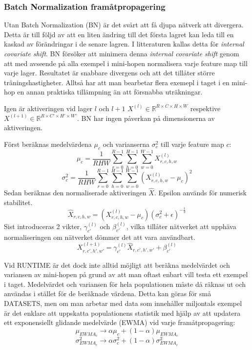\documentclass[a4paper,11pt,twoside]{article}
\begin{document}
\subsubsection{Batch Normalization framåtpropagering}
Utan Batch Normalization (BN) är det svårt att få djupa nätverk att divergera. Detta är till följd av att en liten ändring till det första lagret kan leda till en kaskad av förändringar i de senare lagren. I litteraturen kallas detta för \textit{internal covariate shift}. BN försöker att minimera denna \textit{internal covariate shift} genom att med avseende på alla exempel i mini-hopen normalisera varje feature map till varje lager. Resultatet är snabbare divergens och att det tillåter större träningshastigheter. Alltså har att man bearbetar flera exemepl i taget i en mini-hop en annan praktiska tillämpning än att försnabba uträkningar. 

Igen är aktiveringen vid lager $l$ och $l+1$ $X^{(l)} \in \mathbb{R}^{R \times C \times H \times W}$ respektive $X^{(l+1)} \in \mathbb{R}^{R \times C' \times H' \times W'}$. BN har ingen påverkan på dimensionerna av aktiveringen.

Först beräknas medelvärdena $\mu_c$ och varianserna $\sigma^2_c$ till varje feature map $c$:
\begin{equation}
\mu_c = \frac{1}{RHW} \sum^{R-1}_{r=0} \sum^{H-1}_{h=0} \sum^{W-1}_{w=0} X^{(l)}_{r,c,h,w}
\end{equation}
\begin{equation}
\sigma^2_c  = \frac{1}{RHW} \sum^{R-1}_{r=0} \sum^{H-1}_{h=0} \sum^{W-1}_{w=0} ({X^{(l)}_{r,c,h,w} - \mu_c})^2
\end{equation}
Sedan beräknas den normaliserade aktiveringen $\hat{X}$. Epsilon används för numerisk stabilitet.
\begin{equation}
\hat{X}_{r,c,h,w} = (X^{(l)}_{r,c,h,w} - \mu_c){(\sigma^2_c + \epsilon)}^{-\frac{1}{2}}
\end{equation}
Sist introduceras 2 vikter, $\gamma_{c'}^{(l)}$ och $\beta_{c'}^{(l)}$, vilka tillåter nätverket att upphäva normaliseringen om nätverket dömmer det att vara användbart.
\begin{equation}
X^{(l+1)}_{r,c',h',w'} = \gamma_{c'}^{(l)} \hat{X}_{r,c',h',w'} + \beta_{c'}^{(l)}
\end{equation}

Vid RUNTIME är det dock inte alltid möjligt att beräkna medelvärdet och variansen av mini-hopen på grund av att man oftast enbart vill testa ett exempel i taget. Medelvärdet och variansen för hela populationen måste då räknas ut och användas i stället för de beräknade värdena. Detta kan göras för små DATASETS, men om man arbetar med data som innehåller miljontals exempel är det enklare att uppskatta populationens statistik med hjälp av att updatera ett exponensiellt glidande medelvärde (EWMA) vid varje framåtpropagering:
\begin{equation}
\mu_{EWMA_c} \to \alpha \mu_c + (1-\alpha)\mu_{EWMA_c}
\end{equation}
\begin{equation}
\sigma^2_{EWMA_c} \to \alpha \sigma^2_c + (1-\alpha)\sigma^2_{EWMA_c}
\end{equation}
\end{document}
